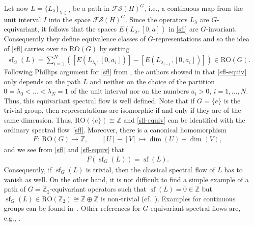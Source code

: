 \documentclass[pdftex]{sigma}
\numberwithin{equation}{section}
\theoremstyle{definition}
\DeclareMathOperator{\sfl}{sf}
\begin{document}
Let now $L=\{L_\lambda\}_{\lambda\in I}$ be a path in $\mathcal{FS}(H)^G$, i.e., a continuous map from the unit interval $I$ into the space $\mathcal{FS}(H)^G$. Since the operators $L_\lambda$ are $G$-equivariant, it follows that the spaces $E(L_{\lambda},[0,a])$ in \eqref{sfl} are $G$-invariant. Consequently they define equivalence classes of $G$-representations and so the idea of \eqref{sfl} carries over to $\mathrm{RO}(G)$ by setting
\begin{align}\label{sfl-equiv}
\sfl_G(L)=\sum^N_{i=1}{([E(L_{\lambda_i},[0,a_i])]-[E(L_{\lambda_{i-1}},[0,a_i])])}\in \mathrm{RO}(G).
\end{align}
Following Phillips argument for \eqref{sfl} from \cite{Phillips}, the authors showed in \cite{MJN21} that \eqref{sfl-equiv} only depends on the path $L$ and neither on the choice of the partition $0=\lambda_0<\dots< \lambda_N=1$ of the unit interval nor on the numbers $a_i>0$, $i=1,\dots,N$. Thus, this equivariant spectral flow is well defined. Note that if $G=\{e\}$ is the trivial group, then representations are isomorphic if and only if they are of the same dimension. Thus, $\mathrm{RO}(\{e\})\cong\mathbb{Z}$ and \eqref{sfl-equiv} can be identified with the ordinary spectral flow~\eqref{sfl}. Moreover, there is a canonical homomorphism
\begin{align*}
F\colon \ \mathrm{RO}(G)\rightarrow\mathbb{Z},\qquad [U]-[V]\mapsto\dim(U)-\dim(V),
\end{align*}
and we see from \eqref{sfl} and \eqref{sfl-equiv} that
\begin{align*}
F(\sfl_G(L))=\sfl(L).
\end{align*}
Consequently, if $\sfl_G(L)$ is trivial, then the classical spectral flow of $L$ has to vanish as well. On the other hand, it is not difficult to find a simple example of a path of $G=\mathbb{Z}_2$-equivariant operators such that $\sfl(L)=0\in\mathbb{Z}$ but $\sfl_G(L)\in \mathrm{RO}(\mathbb{Z}_2)\cong\mathbb{Z}\oplus\mathbb{Z}$ is non-trivial (cf.\ \cite[Section~2.4]{MJN21}). Examples for continuous groups can be found in~\cite{MJN25}. Other references for $G$-equivariant spectral flows are, e.g., \cite{Fang, Hochs,Lim,Liu}.
\end{document}
